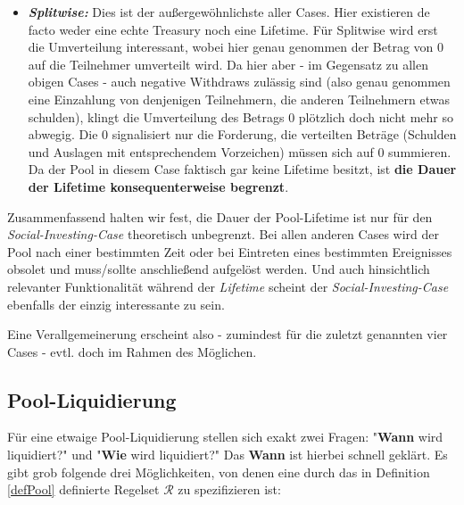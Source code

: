 \begin{itemize}
  \item \textbf{\textit{Splitwise:}} Dies ist der außergewöhnlichste aller Cases. Hier existieren de facto weder eine echte Treasury noch eine Lifetime. Für Splitwise wird erst die Umverteilung interessant, wobei hier genau genommen der Betrag von 0 auf die Teilnehmer umverteilt wird. Da hier aber - im Gegensatz zu allen obigen Cases - auch negative Withdraws zulässig sind (also genau genommen eine Einzahlung von denjenigen Teilnehmern, die anderen Teilnehmern etwas schulden), klingt die Umverteilung des Betrags 0 plötzlich doch nicht mehr so abwegig. Die 0 signalisiert nur die Forderung, die verteilten Beträge (Schulden und Auslagen mit entsprechendem Vorzeichen) müssen sich auf 0 summieren. Da der Pool in diesem Case faktisch gar keine Lifetime besitzt, ist \textbf{die Dauer der Lifetime konsequenterweise begrenzt}.
\end{itemize}

\vspace{0.3cm}

Zusammenfassend halten wir fest, die Dauer der Pool-Lifetime ist nur für den \textit{Social-Investing-Case} theoretisch unbegrenzt. Bei allen anderen Cases wird der Pool nach einer bestimmten Zeit oder bei Eintreten eines bestimmten Ereignisses obsolet und muss/sollte anschließend aufgelöst werden. Und auch hinsichtlich relevanter Funktionalität während der \textit{Lifetime} scheint der \textit{Social-Investing-Case} ebenfalls der einzig interessante zu sein. 

\vspace{0.1cm}

Eine Verallgemeinerung erscheint also - zumindest für die zuletzt genannten vier Cases - evtl. doch im Rahmen des Möglichen. 

\vspace{0.3cm}


\vspace{0.5cm}

\subsection{Pool-Liquidierung}

\vspace{0.3cm}

Für eine etwaige Pool-Liquidierung stellen sich exakt zwei Fragen: "\textbf{Wann} wird liquidiert?" und "\textbf{Wie} wird liquidiert?" Das \textbf{Wann} ist hierbei schnell geklärt. Es gibt grob folgende drei Möglichkeiten, von denen eine durch das in Definition \ref{defPool} definierte Regelset $\mathcal{R}$ zu spezifizieren ist:

